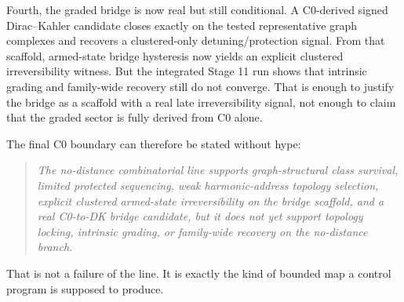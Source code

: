 \documentclass[11pt]{article}
\begin{document}
Fourth, the graded bridge is now real but still conditional. A C0-derived signed Dirac--Kahler candidate closes exactly on the tested representative graph complexes and recovers a clustered-only detuning/protection signal. From that scaffold, armed-state bridge hysteresis now yields an explicit clustered irreversibility witness. But the integrated Stage 11 run shows that intrinsic grading and family-wide recovery still do not converge. That is enough to justify the bridge as a scaffold with a real late irreversibility signal, not enough to claim that the graded sector is fully derived from C0 alone.

The final C0 boundary can therefore be stated without hype:
\begin{quote}
\emph{The no-distance combinatorial line supports graph-structural class survival, limited protected sequencing, weak harmonic-address topology selection, explicit clustered armed-state irreversibility on the bridge scaffold, and a real C0-to-DK bridge candidate, but it does not yet support topology locking, intrinsic grading, or family-wide recovery on the no-distance branch.}
\end{quote}

That is not a failure of the line. It is exactly the kind of bounded map a control program is supposed to produce.
\end{document}
